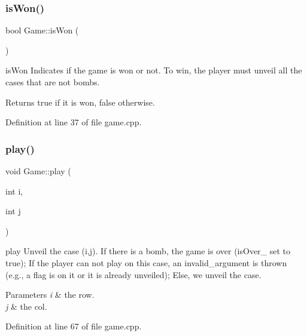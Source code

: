 \mbox{\label{class_game_a00c7a1babd45b85f4e828c2e11819110}} 
\subsubsection{\texorpdfstring{is\+Won()}{isWon()}}
{\footnotesize\ttfamily bool Game\+::is\+Won (\begin{DoxyParamCaption}{ }\end{DoxyParamCaption})}



is\+Won Indicates if the game is won or not. To win, the player must unveil all the cases that are not bombs. 

\begin{DoxyReturn}{Returns}
true if it is won, false otherwise. 
\end{DoxyReturn}


Definition at line 37 of file game.\+cpp.

\mbox{\label{class_game_ae2ad6aa30a56758bcd0842438a04b473}} 
\subsubsection{\texorpdfstring{play()}{play()}}
{\footnotesize\ttfamily void Game\+::play (\begin{DoxyParamCaption}\item[{int}]{i,  }\item[{int}]{j }\end{DoxyParamCaption})}



play Unveil the case (i,j). If there is a bomb, the game is over (is\+Over\+\_\+ set to true); If the player can not play on this case, an invalid\+\_\+argument is thrown (e.\+g., a flag is on it or it is already unveiled); Else, we unveil the case. 


\begin{DoxyParams}{Parameters}
{\em i} & the row. \\
\hline
{\em j} & the col. \\
\hline
\end{DoxyParams}


Definition at line 67 of file game.\+cpp.

\mbox{\label{class_game_a1e50ebc43155a8ef4f01beb2ad769e0d}} 
